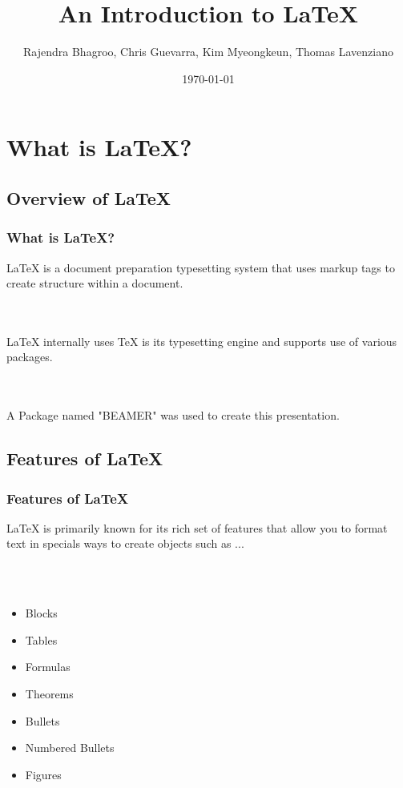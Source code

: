 \documentclass{beamer}
\title[LaTeX]{An Introduction to LaTeX}
\author[Programming Language Concepts - CSCI 318]{Rajendra Bhagroo, Chris Guevarra, Kim Myeongkeun, Thomas Lavenziano}
\institute[NYIT]
{
New York Institute of Technology \\
\medskip
}
\date{\today}
\begin{document}
\begin{frame}
\titlepage
\end{frame}


\section{What is LaTeX?}

\subsection{Overview of LaTeX}

\begin{frame}
\frametitle{What is LaTeX?}

LaTeX is a document preparation typesetting system that uses markup tags to create structure within a document.

\\~\\

LaTeX internally uses TeX is its typesetting engine and supports use of various packages.

\\~\\

A Package named "BEAMER" was used to create this presentation.

\end{frame}


\subsection{Features of LaTeX}

\begin{frame}
\frametitle{Features of LaTeX}

LaTeX is primarily known for its rich set of features that allow you to format text in specials ways to create objects such as ...

\\~\\

\begin{itemize}
\item Blocks
\item Tables
\item Formulas
\item Theorems
\item Bullets
\item Numbered Bullets
\item Figures
\end{itemize}
\end{frame}
\end{document}
